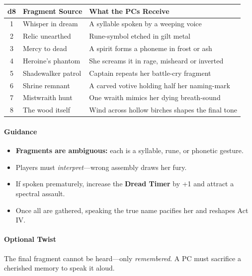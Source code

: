 \documentclass[11pt]{article}
\begin{document}
\begin{center}
\begin{longtable}{cll}
\toprule
\textbf{d8} & \textbf{Fragment Source} & \textbf{What the PCs Receive} \\
\midrule
1 & Whisper in dream & A syllable spoken by a weeping voice \\
2 & Relic unearthed & Rune-symbol etched in gilt metal \\
3 & Mercy to dead & A spirit forms a phoneme in frost or ash \\
4 & Heroine's phantom & She screams it in rage, misheard or inverted \\
5 & Shadewalker patrol & Captain repeats her battle-cry fragment \\
6 & Shrine remnant & A carved votive holding half her naming-mark \\
7 & Mistwraith hunt & One wraith mimics her dying breath-sound \\
8 & The wood itself & Wind across hollow birches shapes the final tone \\
\bottomrule
\end{longtable}
\end{center}

\bigskip

\paragraph{Guidance}

\begin{itemize}
  \item \textbf{Fragments are ambiguous:} each is a syllable, rune, or phonetic gesture.
  \item Players must \emph{interpret}---wrong assembly draws her fury.
  \item If spoken prematurely, increase the \textbf{Dread Timer } by +1 and attract a spectral assault.
  \item Once all are gathered, speaking the true name pacifies her and reshapes Act IV.
\end{itemize}

\paragraph{Optional Twist}
The final fragment cannot be heard---only \emph{remembered}. A PC must sacrifice a cherished memory to speak it aloud.


\end{document}
